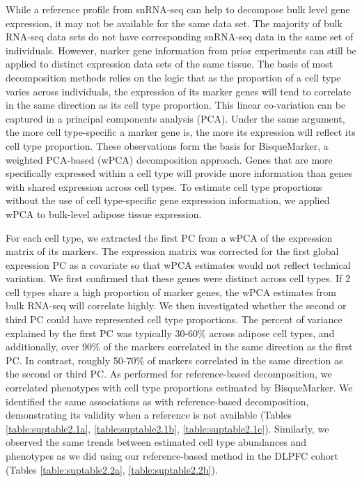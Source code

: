 While a reference profile from snRNA-seq can help to decompose bulk level gene expression, it may not be available for the same data set. The majority of bulk RNA-seq data sets do not have corresponding snRNA-seq data in the same set of individuals. However, marker gene information from prior experiments can still be applied to distinct expression data sets of the same tissue. The basis of most decomposition methods relies on the logic that as the proportion of a cell type varies across individuals, the expression of its marker genes will tend to correlate in the same direction as its cell type proportion. This linear co-variation can be captured in a principal components analysis (PCA). Under the same argument, the more cell type-specific a marker gene is, the more its expression will reflect its cell type proportion. These observations form the basis for BisqueMarker, a weighted PCA-based (wPCA) decomposition approach. Genes that are more specifically expressed within a cell type will provide more information than genes with shared expression across cell types. To estimate cell type proportions without the use of cell type-specific gene expression information, we applied wPCA to bulk-level adipose tissue expression.

For each cell type, we extracted the first PC from a wPCA of the expression matrix of its markers. The expression matrix was corrected for the first global expression PC as a covariate so that wPCA estimates would not reflect technical variation. We first confirmed that these genes were distinct across cell types. If 2 cell types share a high proportion of marker genes, the wPCA estimates from bulk RNA-seq will correlate highly. We then investigated whether the second or third PC could have represented cell type proportions. The percent of variance explained by the first PC was typically 30-60\% across adipose cell types, and additionally, over 90\% of the markers correlated in the same direction as the first PC. In contrast, roughly 50-70\% of markers correlated in the same direction as the second or third PC. As performed for reference-based decomposition, we correlated phenotypes with cell type proportions estimated by BisqueMarker. We identified the same associations as with reference-based decomposition, demonstrating its validity when a reference is not available (Tables \ref{table:suptable2.1a}, \ref{table:suptable2.1b}, \ref{table:suptable2.1c}). Similarly, we observed the same trends between estimated cell type abundances and phenotypes as we did using our reference-based method in the DLPFC cohort (Tables \ref{table:suptable2.2a}, \ref{table:suptable2.2b}). 

